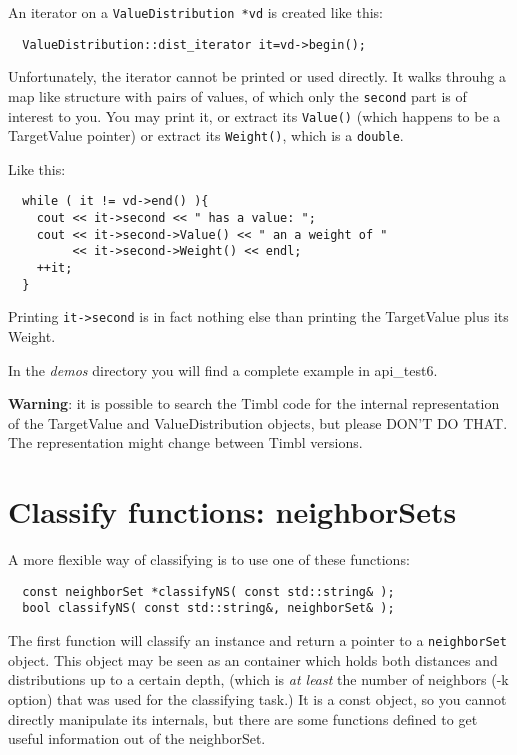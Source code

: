 \documentclass{report}
\begin{document}
An iterator on a {\tt ValueDistribution *vd} is created like this:
\begin{footnotesize}
\begin{verbatim}
  ValueDistribution::dist_iterator it=vd->begin();
\end{verbatim}
\end{footnotesize}

Unfortunately, the iterator cannot be printed or used directly.
It walks throuhg a map like structure with pairs of values, of which
only the {\tt second} part is of interest to you.
You may print it, or extract its {\tt Value()} (which happens to be a
TargetValue pointer) or extract its {\tt Weight()}, which is a {\tt double}.

Like this:
\begin{footnotesize}
\begin{verbatim}
  while ( it != vd->end() ){
    cout << it->second << " has a value: ";
    cout << it->second->Value() << " an a weight of "
         << it->second->Weight() << endl;
    ++it;
  }
\end{verbatim}
\end{footnotesize}
Printing {\tt it->second} is in fact nothing else than printing the
TargetValue plus its Weight.

In the {\em demos}\/ directory you will find a complete example in api\_test6.

{\bf Warning}: it is possible to search the Timbl code for the
internal representation of the TargetValue and ValueDistribution
objects, but please DON'T DO THAT.  The representation might change
between Timbl versions.

\section{Classify functions: neighborSets}

A more flexible way of classifying is to use one of these functions:

\begin{footnotesize}
\begin{verbatim}
  const neighborSet *classifyNS( const std::string& );
  bool classifyNS( const std::string&, neighborSet& );
\end{verbatim}
\end{footnotesize}

The first function will classify an instance and return a pointer to a
{\tt neighborSet} object. This object may be seen as an container
which holds both distances and distributions up to a certain depth,
(which is {\em at least}\/ the number of neighbors (-k option) that
was used for the classifying task.)  It is a const object, so you
cannot directly manipulate its internals, but there are some
functions defined to get useful information out of the neighborSet.
\end{document}
